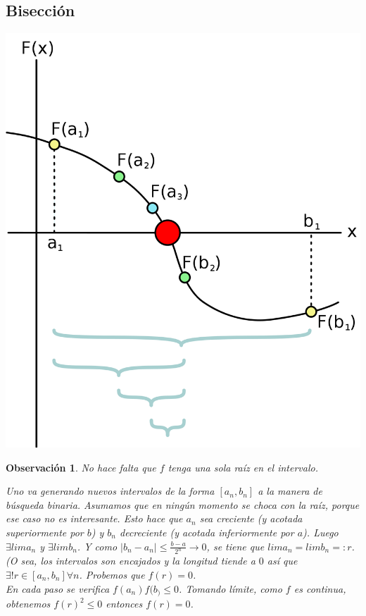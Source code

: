 \documentclass[10pt,a4paper,final]{report}
\newtheorem{observation}{Observación}
\begin{document}
{\subsection{Bisección}

\includegraphics[scale=0.13]{biseccion.png}
\begin{observation}
	No hace falta que $f$ tenga una sola raíz en el intervalo.
	
	Uno va generando nuevos intervalos de la forma $[a_n,b_n]$ a la manera de búsqueda binaria. Asumamos que en ningún momento se choca con la raíz, porque ese caso no es interesante. Esto hace que $a_n$ sea creciente (y acotada superiormente por $b$) y $b_n$ decreciente (y acotada inferiormente por $a$). Luego $\exists lim a_n$ y $\exists lim b_n$. Y como $|b_n-a_n| \leq \frac{b-a}{2^n}\to 0$, se tiene que $lim a_n = lim b_n =: r$. (O sea, los intervalos son encajados y la longitud tiende a $0$ así que $\exists! r \in [a_n,b_n] \forall n$. Probemos que $f(r)=0$.\\
	
	En cada paso se verifica $f(a_n)f(b_) \leq 0$. Tomando límite, como $f$ es continua, obtenemos $f(r)^2 \leq 0$ entonces $f(r)=0$.
\end{observation}

}
\end{document}
